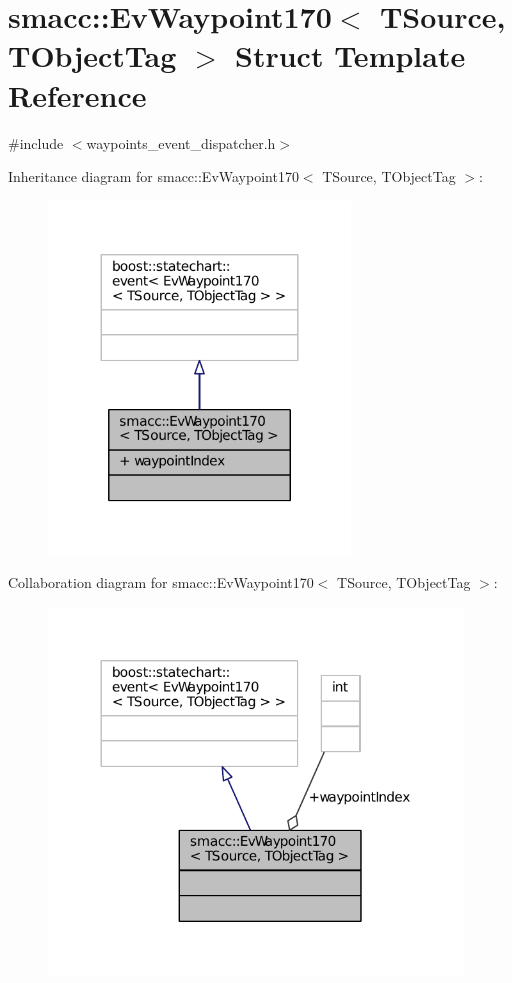 \hypertarget{structsmacc_1_1EvWaypoint170}{}\section{smacc\+:\+:Ev\+Waypoint170$<$ T\+Source, T\+Object\+Tag $>$ Struct Template Reference}
\label{structsmacc_1_1EvWaypoint170}


{\ttfamily \#include $<$waypoints\+\_\+event\+\_\+dispatcher.\+h$>$}



Inheritance diagram for smacc\+:\+:Ev\+Waypoint170$<$ T\+Source, T\+Object\+Tag $>$\+:
\nopagebreak
\begin{figure}[H]
\begin{center}
\leavevmode
\includegraphics[width=227pt]{structsmacc_1_1EvWaypoint170__inherit__graph}
\end{center}
\end{figure}


Collaboration diagram for smacc\+:\+:Ev\+Waypoint170$<$ T\+Source, T\+Object\+Tag $>$\+:
\nopagebreak
\begin{figure}[H]
\begin{center}
\leavevmode
\includegraphics[width=312pt]{structsmacc_1_1EvWaypoint170__coll__graph}
\end{center}
\end{figure}
